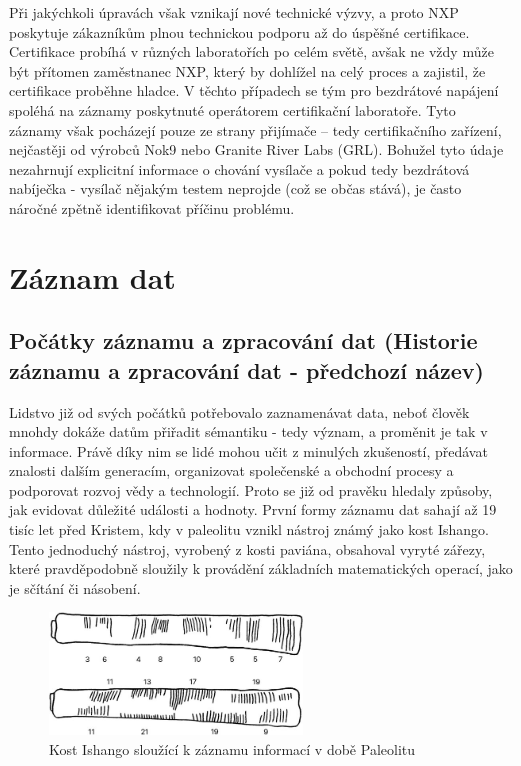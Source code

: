 Při jakýchkoli úpravách však vznikají nové technické výzvy, a proto NXP poskytuje zákazníkům plnou technickou podporu až do úspěšné certifikace. Certifikace 
probíhá v různých laboratořích po celém světě, avšak ne vždy může být přítomen zaměstnanec NXP, který by dohlížel na celý proces a zajistil, že certifikace 
proběhne hladce. V těchto případech se tým pro bezdrátové napájení spoléhá na záznamy poskytnuté operátorem certifikační laboratoře. Tyto záznamy však 
pocházejí pouze ze strany přijímače – tedy certifikačního zařízení, nejčastěji od výrobců Nok9 nebo Granite River Labs (GRL). Bohužel tyto údaje nezahrnují 
explicitní informace o chování vysílače a pokud tedy bezdrátová nabíječka - vysílač nějakým testem neprojde (což se občas stává), je často náročné zpětně 
identifikovat příčinu problému. \cite{nxp_wireless_charging_team}


\chapter{Záznam dat}
\label{zaznam_dat}

\label{uvod}

\section{Počátky záznamu a zpracování dat (Historie záznamu a zpracování dat - předchozí název)}
\label{historie}
Lidstvo již od svých počátků potřebovalo zaznamenávat data, neboť člověk mnohdy dokáže datům přiřadit sémantiku - tedy význam, a proměnit je tak v informace. 
Právě díky nim se lidé mohou učit z minulých zkušeností, předávat znalosti dalším generacím, organizovat společenské a obchodní procesy a podporovat rozvoj 
vědy a technologií. Proto se již od pravěku hledaly způsoby, jak evidovat důležité události a hodnoty. První formy záznamu dat sahají až 19 tisíc let před 
Kristem, kdy v paleolitu vznikl nástroj známý jako kost Ishango. Tento jednoduchý nástroj, vyrobený z kosti paviána, obsahoval vyryté zářezy, které 
pravděpodobně sloužily k provádění základních matematických operací, jako je sčítání či násobení.

\begin{figure}[h] %
    \centering
    \includegraphics[width=0.6\textwidth]{obrazky-figures/ishango.jpg}
    \caption{Kost Ishango sloužící k záznamu informací v době Paleolitu \cite{ishango_picture}}
    \label{fig:ishango}
\end{figure}

